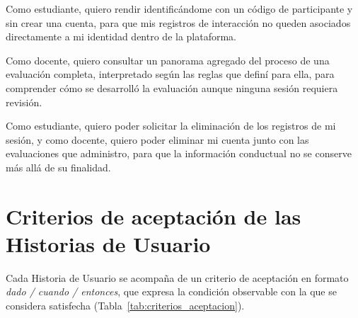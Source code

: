 \begin{description}[leftmargin=0cm, style=nextline]
\item[\textbf{HU10 --- Participación sin identificación directa}] Como estudiante, quiero rendir identificándome con un código de participante y sin crear una cuenta, para que mis registros de interacción no queden asociados directamente a mi identidad dentro de la plataforma.
\item[\textbf{HU11 --- Panorama de la evaluación}] Como docente, quiero consultar un panorama agregado del proceso de una evaluación completa, interpretado según las reglas que definí para ella, para comprender cómo se desarrolló la evaluación aunque ninguna sesión requiera revisión.
\item[\textbf{HU12 --- Eliminación de los datos}] Como estudiante, quiero poder solicitar la eliminación de los registros de mi sesión, y como docente, quiero poder eliminar mi cuenta junto con las evaluaciones que administro, para que la información conductual no se conserve más allá de su finalidad.
\end{description}

\section{Criterios de aceptación de las Historias de Usuario}
\label{sec:criterios_aceptacion}

Cada Historia de Usuario se acompaña de un criterio de aceptación en formato \textit{dado / cuando / entonces}, que expresa la condición observable con la que se considera satisfecha (Tabla~\ref{tab:criterios_aceptacion}).

